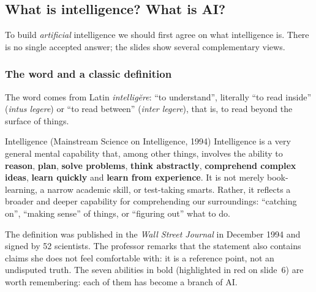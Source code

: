 \subsection{What is intelligence? What is AI?}
\label{sec:what-is-intelligence}

To build \emph{artificial} intelligence we should first agree on what intelligence is.
There is no single accepted answer; the slides show several complementary views.

\subsubsection{The word and a classic definition}

The word comes from Latin \emph{intellig\u{e}re}: ``to understand'', literally
``to read inside'' (\emph{intus legere}) or ``to read between'' (\emph{inter legere}),
that is, to read beyond the surface of things.

\begin{nbdef}{Intelligence (Mainstream Science on Intelligence, 1994)}
Intelligence is a very general mental capability that, among other things, involves the
ability to \textbf{reason}, \textbf{plan}, \textbf{solve problems}, \textbf{think abstractly},
\textbf{comprehend complex ideas}, \textbf{learn quickly} and \textbf{learn from experience}.
It is not merely book-learning, a narrow academic skill, or test-taking smarts. Rather, it
reflects a broader and deeper capability for comprehending our surroundings:
``catching on'', ``making sense'' of things, or ``figuring out'' what to do.
\end{nbdef}

The definition was published in the \emph{Wall Street Journal} in December 1994 and signed
by 52 scientists. The professor remarks that the statement also contains claims she does not
feel comfortable with: it is a reference point, not an undisputed truth.
The seven abilities in bold (highlighted in red on slide~6) are worth remembering: each of
them has become a branch of AI.

